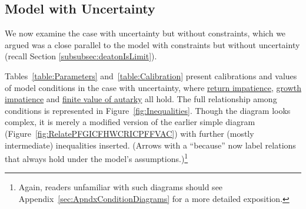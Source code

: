 \documentclass[BufferStockTheory]{subfiles}
\begin{document}
\hypertarget{TheModelUncertainty}{}
\subsection{Model with Uncertainty}\label{subsec:TheModelUncertainty}

We now examine the case with uncertainty but without constraints, which we argued was a close parallel to the model with constraints but without uncertainty (recall Section \ref{subsubsec:deatonIsLimit}).
\hypertarget{Calibration}{}


\hypertarget{Symbols}{}




Tables~\ref{table:Parameters} and~\ref{table:Calibration} present calibrations and values of model conditions in the case with uncertainty, where \hyperlink{RIC}{return impatience}, \hyperlink{GICRaw}{growth impatience} and \hyperlink{FVAC}{finite value of autarky} all hold.  The full relationship among conditions is represented in Figure~\ref{fig:Inequalities}.  Though the diagram looks complex, it is merely a modified version of the earlier simple diagram (Figure~\ref{fig:RelatePFGICFHWCRICPFFVAC}) with further (mostly intermediate) inequalities inserted.  (Arrows with a ``because'' now label relations that always hold under the model's assumptions.)\footnote{Again, readers unfamiliar with such diagrams should see Appendix~\ref{sec:ApndxConditionDiagrams} for a more detailed exposition.}

\renewcommand{\figName}{Inequalities} 
\renewcommand{\figFile}{\figName} 
\hypertarget{\figFile}{}
\end{document}
